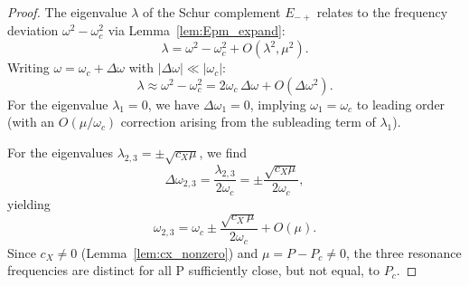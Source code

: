 \documentclass[12pt,a4paper]{amsart}
\theoremstyle{remark}
\begin{document}
\begin{proof}
The eigenvalue $\lambda$ of the Schur complement $E_{-+}$ relates to the frequency deviation
$\omega^2 - \omega_c^2$ via Lemma~\ref{lem:Epm_expand}:
\[
  \lambda = \omega^2 - \omega_c^2 + O(\lambda^2, \mu^2).
\]
Writing $\omega = \omega_c + \Delta\omega$ with $|\Delta\omega|\ll|\omega_c|$:
\[
  \lambda \approx \omega^2 - \omega_c^2 = 2\omega_c\,\Delta\omega + O(\Delta\omega^2).
\]
For the eigenvalue $\lambda_1 = 0$, we have $\Delta\omega_1 = 0$, implying $\omega_1 = \omega_c$
to leading order (with an $O(\mu/\omega_c)$ correction arising from the subleading term of $\lambda_1$).

For the eigenvalues $\lambda_{2,3} = \pm\sqrt{c_X\mu}$, we find
\[
  \Delta\omega_{2,3} = \frac{\lambda_{2,3}}{2\omega_c}
  = \pm\frac{\sqrt{c_X\mu}}{2\omega_c},
\]
yielding
\[
  \omega_{2,3} = \omega_c \pm \frac{\sqrt{c_X\,\mu}}{2\omega_c} + O(\mu).
\]
Since $c_X \neq 0$ (Lemma~\ref{lem:cx_nonzero})
and $\mu = P - P_c \neq 0$, the three resonance frequencies are distinct for all
P sufficiently close, but not equal, to $P_c$.
\end{proof}
\end{document}
